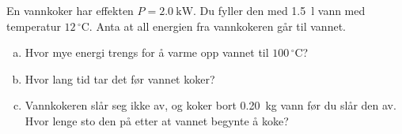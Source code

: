 %
En vannkoker har effekten $P = \SI{2.0}{\kilo\watt}$. Du fyller den med \SI{1.5}{\litre} vann med temperatur $12\,^\circ$C. Anta at all energien fra vannkokeren går til vannet.
\begin{enumerate}[a)]
    \item Hvor mye energi trengs for å varme opp vannet til $100\,^\circ$C?
    \item Hvor lang tid tar det før vannet koker?
    \item Vannkokeren slår seg ikke av, og koker bort \SI{0.20}{\kilo\gram} vann før du slår den av. Hvor lenge sto den på etter at vannet begynte å koke?
\end{enumerate}
%
